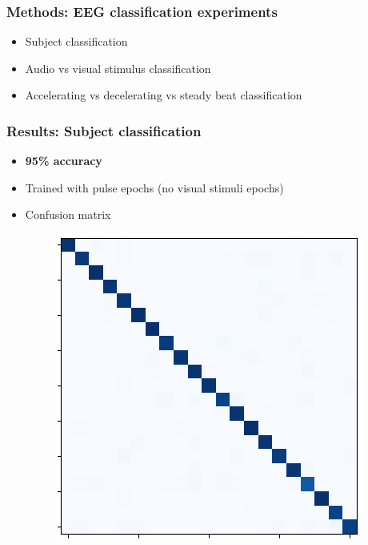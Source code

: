\documentclass{beamer}
\begin{document}
\begin{frame}
	\frametitle{Methods: EEG classification experiments}

	\begin{itemize}
		
		\item Subject classification 

		\item Audio vs visual stimulus classification

		\item Accelerating vs decelerating vs steady beat classification

	\end{itemize}

\end{frame}

\begin{frame}
	\frametitle{Results: Subject classification}

	\begin{itemize}
		
		\item \textbf{95\% accuracy}

		\item Trained with pulse epochs (no visual stimuli epochs) 

		\item Confusion matrix
		\begin{figure}
			\centering
			\includegraphics[scale=1.0]{fig14.png}
		\end{figure}
	\end{itemize}

\end{frame}
\end{document}
